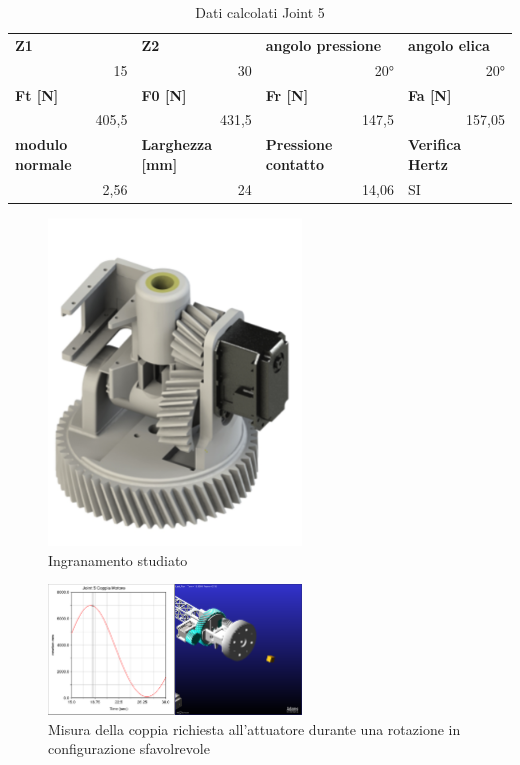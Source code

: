 \documentclass[%
corpo=11pt,
twoside,
 stile=classica,
oldstyle,
greek,%
]{toptesi}
\begin{document}
		\begin{table}[htbp]
			\centering
			\caption{Dati calcolati Joint 5}
			\begin{tabular}{rrrl}
				\multicolumn{1}{l}{\textbf{Z1}} & \multicolumn{1}{l}{\textbf{Z2}} & \multicolumn{1}{l}{\textbf{angolo pressione}} & \textbf{angolo elica} \\
				15    & 30    & 20°    & \multicolumn{1}{r}{20°} \\
				\multicolumn{1}{l}{\textbf{Ft [N]}} & \multicolumn{1}{l}{\textbf{F0 [N]}} & \multicolumn{1}{l}{\textbf{Fr [N]}} & \textbf{Fa [N]} \\
				405,5 & 431,5 & 147,5 & \multicolumn{1}{r}{157,05} \\
				\multicolumn{1}{l}{\textbf{modulo normale}} & \multicolumn{1}{l}{\textbf{Larghezza [mm]}} & \multicolumn{1}{l}{\textbf{Pressione contatto}} & \textbf{Verifica Hertz} \\
				2,56 & 24    & 14,06  & SI \\
			\end{tabular}%
			\label{tab:lewis2}%
		\end{table}%
		\begin{figure}
			\centering
			\includegraphics[width=0.6\textwidth]{Plots/POLSO2/wrist2.png}
			\caption{Ingranamento studiato}
			\label{fig:wrist2}
		\end{figure} 
		\begin{figure}
			\centering
			\includegraphics[width=0.6\textwidth]{Plots/POLSO2/polso2torque.png}
			\caption{Misura della coppia richiesta all'attuatore durante una rotazione in configurazione sfavolrevole}
			\label{fig:MBDpolso2t}
		\end{figure} 
\end{document}
